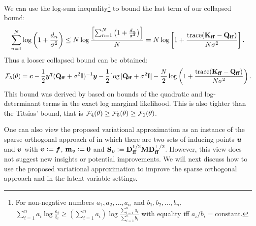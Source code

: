 We can use the log-sum inequality\footnote{For non-negative numbers $a_1, a_2, \ldots, a_n$ and $b_1, b_2, \ldots, b_n$, $\sum_{i=1}^{n} a_i \log \frac{a_i}{b_i} \geq \left(\sum_{i=1}^{n} a_i \right) \log \frac{\sum_{i=1}^{n} a_i}{\sum_{i=1}^{n} b_i}$ with equality iff $a_i/b_i = \text{constant}$.} to bound the last term of our collapsed bound:
\begin{align}
    \sum_{n=1}^N \log \left( 1 + \frac{d_n}{\sigma^2} \right) \leq N \log \frac{ \left[\sum_{n=1}^N \left(1 + \frac{d_n}{\sigma^2}\right)\right]} {N} = N \log \left[1 + \frac{\mathrm{trace} (\mathbf{K}_{\mathbf{ff}} - \mathbf{Q}_{\mathbf{ff}})}{N\sigma^2}\right].
\end{align}
Thus a looser collapsed bound can be obtained:
\begin{align}
    {\mathcal{F}}_5(\theta) ={\bm{c}} - \frac{1}{2} {\bm{y}}^\intercal (\mathbf{Q}_{\mathbf{ff}} + \sigma^2{\mathbf{I}})^{-1} {\bm{y}} - \frac{1}{2} \log |\mathbf{Q}_{\mathbf{ff}} + \sigma^2{\mathbf{I}}| - \frac{N}{2} \log \left( 1+\frac{\mathrm{trace}(\mathbf{K}_{\mathbf{ff}} - \mathbf{Q}_{\mathbf{ff}})}{N\sigma^2} \right). \nonumber
\end{align}
This bound was derived by \citet{artemev2021tighter} based on bounds of the quadratic and log-determinant terms in the exact log marginal likelihood. This is also tighter than the Titsias' bound, that is ${\mathcal{F}}_4(\theta) \geq {\mathcal{F}}_5(\theta) \geq {\mathcal{F}}_1(\theta)$.

One can also view the proposed variational approximation as an instance of the sparse orthogonal approach of \citet{shi2020sparse} in which there are two sets of inducing points ${\bm{u}}$ and ${\bm{v}}$ with ${\bm{v}} \vcentcolon= {\bm{f}}$, ${\mathbf{m}}_{\bm{v}} \vcentcolon= {\bm{0}}$ and ${\mathbf{S}}_{\bm{v}} \vcentcolon= \mathbf{D}_{\mathbf{ff}}^{1/2}{\mathbf{M}} \mathbf{D}_{\mathbf{ff}}^{\top/2}$. However, this view does not suggest new insights or potential improvements. We will next discuss how to use the proposed variational approximation to improve the sparse orthogonal approach and in the latent variable settings.

